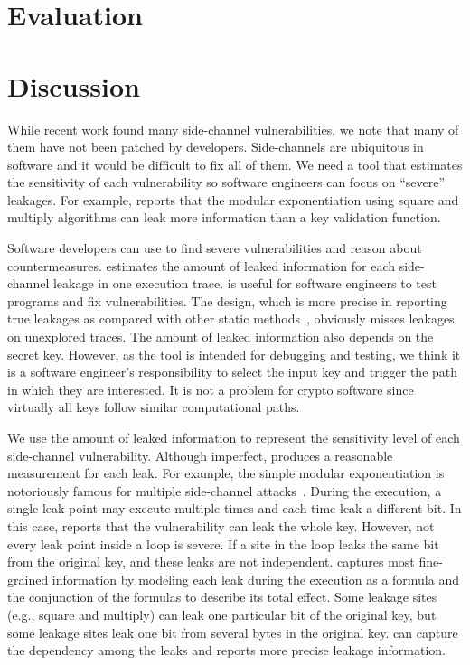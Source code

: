 \section{Evaluation}

\section{Discussion}
While recent work found many side-channel vulnerabilities,
we note that many of them have not been patched by developers.
Side-channels are ubiquitous in software and it would be difficult to fix all of them.
We need a tool that estimates the sensitivity of each vulnerability
so software engineers can focus on
``severe'' leakages. For example, \tool{} reports that
the modular exponentiation using square and multiply algorithms can
leak more information than a key validation function.

Software developers can use \tool{} to find severe vulnerabilities
and reason about countermeasures.
\tool{} estimates the amount of leaked information for each side-channel leakage
in one execution trace. \tool{} is useful for software
engineers to test programs and fix vulnerabilities.
The design, which is more precise in reporting true leakages as compared with other static
methods~\cite{197207,BacelarAlmeida:2013:FVS:2483313.2483334}, obviously misses
leakages on unexplored traces. The amount of leaked information also depends on the secret key.
However, as the tool is intended for debugging and testing,
we think it is a software engineer's responsibility to select the input key and trigger
the path in which they are interested. It is not a problem for crypto software
since virtually all keys follow similar computational paths.

We use the amount of leaked information to represent the sensitivity level of
each side-channel vulnerability. Although imperfect, \tool{} produces a reasonable
measurement for each leak. For example, the simple modular exponentiation is
notoriously famous for multiple side-channel attacks~\cite{kocher1996timing}.
During the execution, a single leak point may execute multiple times
and each time leak a different bit. In this case, \tool{} reports that the
vulnerability can leak the whole key. However, not every leak point inside a
loop is severe. If a site in the loop leaks the same bit from the
original key, and these leaks are not independent. \tool{} captures most
fine-grained information by modeling each leak during the execution as a
formula and the conjunction of the formulas to describe its total effect.
Some leakage sites (e.g., square and multiply)
can leak one particular bit of the original key, but some leakage sites leak one bit
from several bytes in the original key. \tool{} can capture the dependency among the leaks and
reports more precise leakage information.

